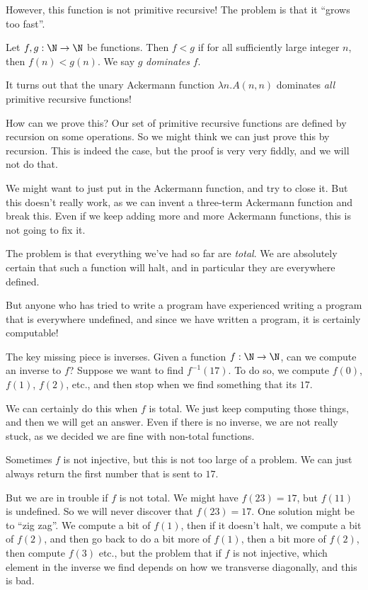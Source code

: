 \documentclass[a4paper]{article}
\begin{document}
However, this function is not primitive recursive! The problem is that it ``grows too fast''.
\begin{defi}\index{$<$}
  Let $f, g: \N \to \N$ be functions. Then $f < g$ if for all sufficiently large integer $n$, then $f(n) < g(n)$. We say $g$ \emph{dominates} $f$.
\end{defi}
It turns out that the unary Ackermann function $\lambda n. A(n, n)$ dominates \emph{all} primitive recursive functions!

How can we prove this? Our set of primitive recursive functions are defined by recursion on some operations. So we might think we can just prove this by recursion. This is indeed the case, but the proof is very very fiddly, and we will not do that.

We might want to just put in the Ackermann function, and try to close it. But this doesn't really work, as we can invent a three-term Ackermann function and break this. Even if we keep adding more and more Ackermann functions, this is not going to fix it.

The problem is that everything we've had so far are \emph{total}.  We are absolutely certain that such a function will halt, and in particular they are everywhere defined.

But anyone who has tried to write a program have experienced writing a program that is everywhere undefined, and since we have written a program, it is certainly computable!

The key missing piece is inverses. Given a function $f: \N \to \N$, can we compute an inverse to $f$? Suppose we want to find $f^{-1}(17)$. To do so, we compute $f(0)$, $f(1)$, $f(2)$, etc., and then stop when we find something that its $17$.

We can certainly do this when $f$ is total. We just keep computing those things, and then we will get an answer. Even if there is no inverse, we are not really stuck, as we decided we are fine with non-total functions.

Sometimes $f$ is not injective, but this is not too large of a problem. We can just always return the first number that is sent to $17$.

But we are in trouble if $f$ is not total. We might have $f(23) = 17$, but $f(11)$ is undefined. So we will never discover that $f(23) = 17$. One solution might be to ``zig zag''. We compute a bit of $f(1)$, then if it doesn't halt, we compute a bit of $f(2)$, and then go back to do a bit more of $f(1)$, then a bit more of $f(2)$, then compute $f(3)$ etc., but the problem that if $f$ is not injective, which element in the inverse we find depends on how we transverse diagonally, and this is bad.

\printindex
\end{document}
